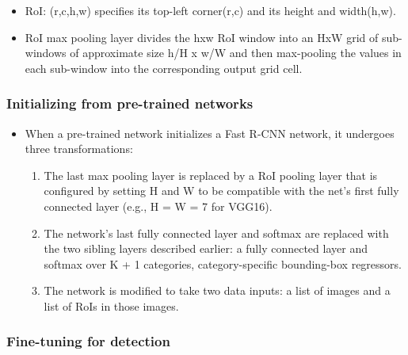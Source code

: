 \documentclass[11pt]{article}
\begin{document}
\begin{itemize}
\item RoI: (r,c,h,w) specifies its top-left corner(r,c) and its height and width(h,w).
\item RoI max pooling layer divides the hxw RoI window into an HxW grid of sub-windows of
      approximate size h/H x w/W and then max-pooling the values in each sub-window into 
      the corresponding output grid cell.
\end{itemize}
\subsubsection{Initializing from pre-trained networks}
\label{sec-2-1-2}


\begin{itemize}
\item When a pre-trained network initializes a Fast R-CNN network, it undergoes three
      transformations:
\begin{enumerate}
\item The last max pooling layer is replaced by a RoI pooling layer that is configured
         by setting H and W to be compatible with the net's first fully connected layer
         (e.g., H = W = 7 for VGG16).
\item The network's last fully connected layer and softmax are replaced with the two 
         sibling layers described earlier: a fully connected layer and softmax over K + 1
         categories, category-specific bounding-box regressors.
\item The network is modified to take two data inputs: a list of images and a list of
         RoIs in those images.
\end{enumerate}
\end{itemize}
\subsubsection{Fine-tuning for detection}
\label{sec-2-1-3}
\end{document}
